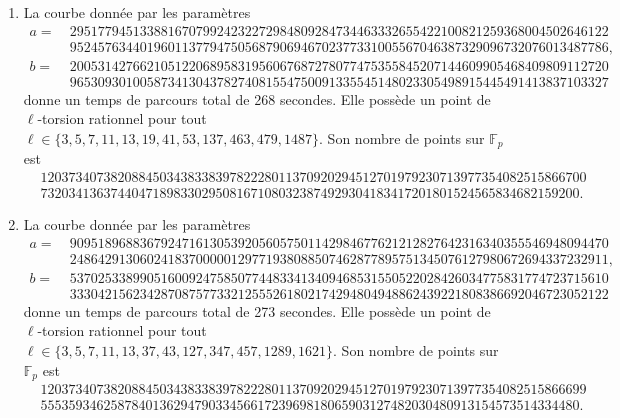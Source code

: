 \documentclass[11pt,a4paper]{article}
\newcommand{\F}{\mathbb{F}}
\theoremstyle{definition}
\begin{document}
\begin{enumerate}
\item La courbe donnée par les paramètres
$$\begin{aligned}
a =\ & 29517794513388167079924232272984809284734463332655422100821259368004502646122 \\
&952457634401960 11377947505687906946702377331005567046387329096732076013487786,\\
b =\ & 20053142766210512206895831956067687278077475355845207144609905468409809112720 \\ &96530930100587341304378274081554750091335545148023305498915445491413837103327
\end{aligned}$$
donne un temps de parcours total de 268 secondes. Elle possède un point de $\ell$-torsion rationnel pour tout $\ell\in\{3, 5, 7, 11, 13, 19, 41, 53, 137, 463, 479, 1487\}$. Son nombre de points sur $\F_p$ est
$$\begin{aligned}
&120373407382088450343833839782228011370920294512701979230713977354082515866700 \\ 
&73203413637440471898330295081671080323874929304183417201801524565834682159200.
\end{aligned}$$

\item La courbe donnée par les paramètres
$$\begin{aligned}
a =\ & 90951896883679247161305392056057501142984677621212827642316340355546948094470 \\
&24864291306024183700000129771938088507462877895751345076127980672694337232911,\\
b =\ & 53702533899051600924758507744833413409468531550522028426034775831774723715610 \\
&33304215623428708757733212555261802174294804948862439221808386692046723052122
\end{aligned}$$
donne un temps de parcours total de 273 secondes. Elle possède un point de $\ell$-torsion rationnel pour tout $\ell\in\{3, 5, 7, 11, 13, 37, 43, 127, 347, 457, 1289, 1621\}$. Son nombre de points sur $\F_p$ est
$$\begin{aligned} 
&120373407382088450343833839782228011370920294512701979230713977354082515866699 \\
&55535934625878401362947903345661723969818065903127482030480913154573514334480.
\end{aligned}$$


\end{enumerate}
\end{document}
